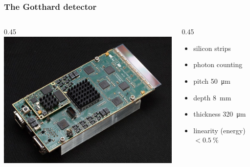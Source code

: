 \documentclass[first,firstsupp]{ETHclass}
\begin{document}
    \begin{frame}
        \frametitle{The Gotthard detector}
        \begin{columns}
            \begin{column}
                {0.45\textwidth}
                \includegraphics[width=\textwidth]{gotthard}
            \end{column}
            \begin{column}
                {0.45\textwidth}
                \begin{itemize}
                    \item silicon strips
                    \item photon counting
                    \item pitch \SI{50}{\micro\metre}
                    \item depth \SI{8}{\milli\metre}
                    \item thickness \SI{320}{\micro\metre}
                    \item linearity (energy) $< \SI{0.5}{\percent}$
                \end{itemize}
            \end{column}
        \end{columns}
    \end{frame}
\end{document}
